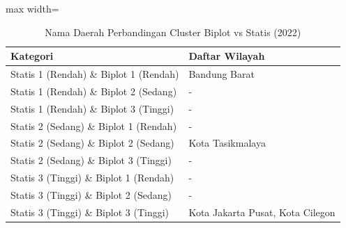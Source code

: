 \begin{table}[H]
\centering
\caption{Nama Daerah Perbandingan Cluster Biplot vs Statis (2022)} \label{tab:samplebiplot_statis_name_2022}
\begin{adjustbox}{max width=\textwidth}
\begin{tabular}{|p{4cm}|p{10cm}|}
\hline
\textbf{Kategori} & \textbf{Daftar Wilayah} \\
\hline
Statis 1 (Rendah) \& Biplot 1 (Rendah) & Bandung Barat \\
\hline
Statis 1 (Rendah) \& Biplot 2 (Sedang) & - \\
\hline
Statis 1 (Rendah) \& Biplot 3 (Tinggi) & - \\
\hline
Statis 2 (Sedang) \& Biplot 1 (Rendah) & - \\
\hline
Statis 2 (Sedang) \& Biplot 2 (Sedang) & Kota Tasikmalaya \\
\hline
Statis 2 (Sedang) \& Biplot 3 (Tinggi) & - \\
\hline
Statis 3 (Tinggi) \& Biplot 1 (Rendah) & - \\
\hline
Statis 3 (Tinggi) \& Biplot 2 (Sedang) & - \\
\hline
Statis 3 (Tinggi) \& Biplot 3 (Tinggi) & Kota Jakarta Pusat, Kota Cilegon \\
\hline
\end{tabular}
\end{adjustbox}
\end{table}